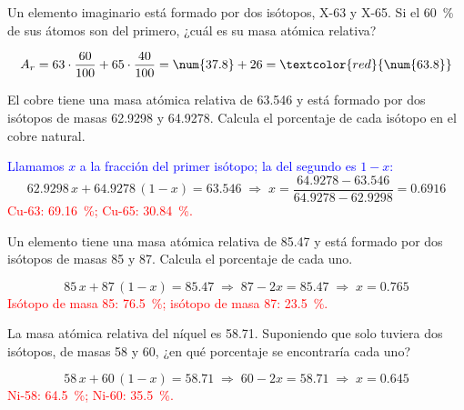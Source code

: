 \begin{exercise}
    Un elemento imaginario está formado por dos isótopos, X-63 y X-65. Si el \qty{60}{\percent} de sus átomos son del primero, ¿cuál es su masa atómica relativa?
    \begin{solu}
        \[ A_r = 63 \cdot \frac{60}{100} + 65 \cdot \frac{40}{100} = \num{37.8} + 26 = \textcolor{red}{\num{63.8}} \]
    \end{solu}
\end{exercise}

\begin{exercise}
    El cobre tiene una masa atómica relativa de \num{63.546} y está formado por dos isótopos de masas \num{62.9298} y \num{64.9278}. Calcula el porcentaje de cada isótopo en el cobre natural.
    \begin{solu}
        \textcolor{blue}{Llamamos \(x\) a la fracción del primer isótopo; la del segundo es \(1 - x\):}
        \[ \num{62.9298}\,x + \num{64.9278}\,(1 - x) = \num{63.546} \;\Rightarrow\; x = \frac{\num{64.9278} - \num{63.546}}{\num{64.9278} - \num{62.9298}} = \num{0.6916} \]
        \textcolor{red}{Cu-63: \qty{69.16}{\percent}; Cu-65: \qty{30.84}{\percent}.}
    \end{solu}
\end{exercise}

\begin{exercise}
    Un elemento tiene una masa atómica relativa de \num{85.47} y está formado por dos isótopos de masas 85 y 87. Calcula el porcentaje de cada uno.
    \begin{solu}
        \[ 85\,x + 87\,(1 - x) = \num{85.47} \;\Rightarrow\; 87 - 2x = \num{85.47} \;\Rightarrow\; x = \num{0.765} \]
        \textcolor{red}{Isótopo de masa 85: \qty{76.5}{\percent}; isótopo de masa 87: \qty{23.5}{\percent}.}
    \end{solu}
\end{exercise}

\begin{exercise}
    La masa atómica relativa del níquel es \num{58.71}. Suponiendo que solo tuviera dos isótopos, de masas 58 y 60, ¿en qué porcentaje se encontraría cada uno?
    \begin{solu}
        \[ 58\,x + 60\,(1 - x) = \num{58.71} \;\Rightarrow\; 60 - 2x = \num{58.71} \;\Rightarrow\; x = \num{0.645} \]
        \textcolor{red}{Ni-58: \qty{64.5}{\percent}; Ni-60: \qty{35.5}{\percent}.}
    \end{solu}
\end{exercise}

